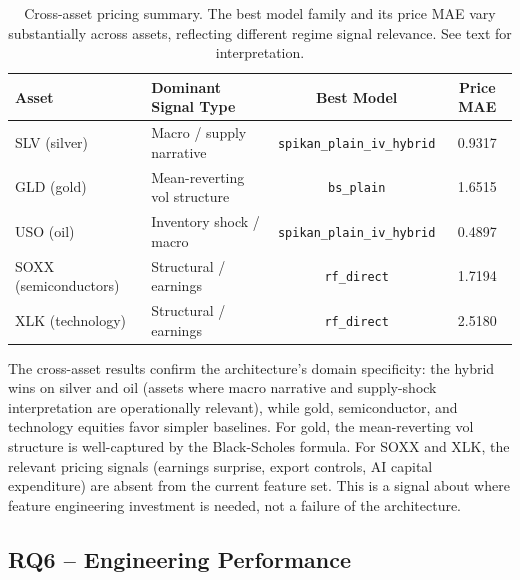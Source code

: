 \documentclass[11pt,a4paper]{article}
\begin{document}
\begin{table}[ht]
\centering
\caption{Cross-asset pricing summary. The best model family and its price MAE vary
substantially across assets, reflecting different regime signal relevance. See text
for interpretation.}
\begin{tabular}{@{}llcc@{}}
\toprule
Asset & Dominant Signal Type & Best Model & Price MAE \\ \midrule
SLV (silver) & Macro / supply narrative & \texttt{spikan\_plain\_iv\_hybrid} & 0.9317 \\
GLD (gold) & Mean-reverting vol structure & \texttt{bs\_plain} & 1.6515 \\
USO (oil) & Inventory shock / macro & \texttt{spikan\_plain\_iv\_hybrid} & 0.4897 \\
SOXX (semiconductors) & Structural / earnings & \texttt{rf\_direct} & 1.7194 \\
XLK (technology) & Structural / earnings & \texttt{rf\_direct} & 2.5180 \\
\bottomrule
\end{tabular}
\label{tab:cross_asset}
\end{table}

The cross-asset results confirm the architecture's domain specificity: the hybrid wins
on silver and oil (assets where macro narrative and supply-shock interpretation are
operationally relevant), while gold, semiconductor, and technology equities favor
simpler baselines. For gold, the mean-reverting vol structure is well-captured by the
Black-Scholes formula. For SOXX and XLK, the relevant pricing signals (earnings
surprise, export controls, AI capital expenditure) are absent from the current feature
set. This is a signal about where feature engineering investment is needed, not a
failure of the architecture.

\subsection{RQ6 -- Engineering Performance}
\label{sec:rq6}
\end{document}
